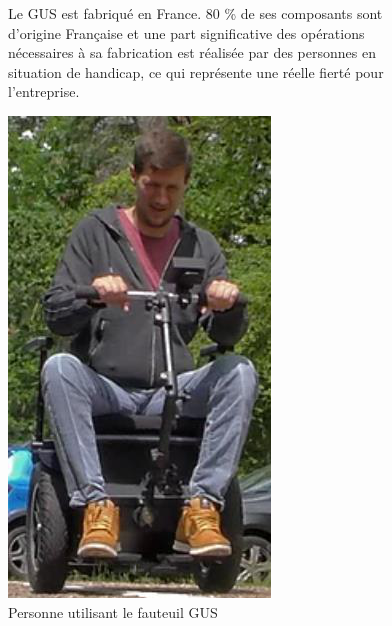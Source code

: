 \begin{figure}[ht!]
\begin{minipage}{0.65\linewidth}
Le GUS est fabriqué en France. 80 \% de ses composants sont d'origine
Française et une part significative des opérations nécessaires à sa
fabrication est réalisée par des personnes en situation de handicap, ce
qui représente une réelle fierté pour l'entreprise.
\end{minipage}\hfill
\begin{minipage}{0.3\linewidth}
\centering\includegraphics[width=0.9\linewidth]{img/fig01.png}
\caption{\label{fig01} Personne utilisant le fauteuil GUS}
\end{minipage}
\end{figure}


